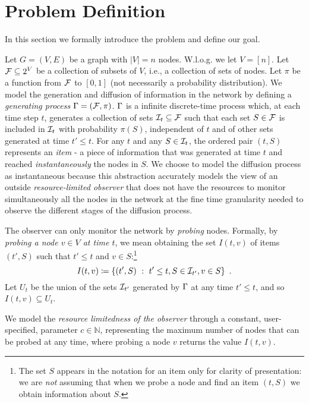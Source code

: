\section{Problem Definition}\label{sec:prelims}
In this section we formally introduce the problem and define our goal.

Let $G=(V,E)$ be a graph with $|V|=n$ nodes. W.l.o.g. we let $V=[n]$. Let
$\mathcal{F}\subseteq 2^V$ be a collection of subsets of $V$, i.e., a collection of
sets of nodes. Let $\pi$ be a function from $\mathcal{F}$ to $[0,1]$ (not
necessarily a probability distribution). We model the generation and diffusion
of  information in the network by defining a \emph{generating
process} $\Gamma=(\mathcal{F},\pi)$.  $\Gamma$ is a infinite discrete-time process
which, at each time step $t$, generates a collection of sets $\mathcal{I}_t\subseteq\mathcal{F}$ such
that each set $S\in\mathcal{F}$ is included in $\mathcal{I}_t$ with probability $\pi(S)$,
independent of $t$ and of other sets generated at time $t'\leq t$.
For any $t$ and any $S\in\mathcal{I}_t$, the ordered pair $(t,S)$ represents an
\emph{item} - a piece of information that was generated at time
$t$ and reached \emph{instantaneously} the nodes in $S$. We choose to model the
diffusion process as instantaneous because this abstraction accurately models the view of an outside
\emph{resource-limited observer} that does not have the resources to monitor simultaneously all
the nodes in the network at the fine time granularity needed to observe the
different stages of the diffusion process.

 The observer can only monitor the network by
\emph{probing} nodes. Formally, by \emph{probing a node $v\in V$ at time $t$},
we mean obtaining the set $I(t,v)$ of items $(t',S)$ such
that $t'\le t$ and $v\in S$:\footnote{The set $S$ appears in the notation for an
	item only for clarity of presentation: we are \emph{not} assuming that when
we probe a node and find an item $(t,S)$ we obtain information about $S$.}
\[
	I(t,v)\coloneqq\{(t',S) ~:~ t'\le t, S\in\mathcal{I}_{t'}, v\in S\}\enspace.
\]
Let $U_t$ be the union of the sets $\mathcal{I}_{t'}$ generated by $\Gamma$
at any time $t'\le t$, and so $I(t,v)\subseteq U_t$.

%
We model the \emph{resource limitedness of the observer} through a constant,
user-specified, parameter $c\in\mathbb{N}$, representing the maximum number of
nodes that can be probed at any time, where probing a node $v$ returns the value $I(t,v)$.


